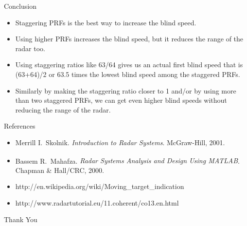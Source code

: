 \documentclass[mathserif]{beamer}
\begin{document}
    
    \begin{frame}{Conclusion}
      \begin{itemize}
       \item Staggering PRFs is the best way to increase the blind speed.
       \item Using higher PRFs increases the blind speed, but it reduces the range of the radar too.
       \item Using staggering ratios like 63/64 gives us an actual first blind speed that is (63+64)/2 or 63.5 times the lowest blind speed among the staggered PRFs.
       \item Similarly by making the staggering ratio closer to 1 and/or by using more than two staggered PRFs, we can get even higher blind speeds without reducing the range of the radar.
      \end{itemize}
    \end{frame}
    
    
    
    \begin{frame}{References}
        
        \begin{itemize}
                 \item Merrill I.~Skolnik. \emph{Introduction to Radar Systems}. McGraw-Hill, 2001.
                 \item Bassem R.~Mahafza. \emph{Radar Systems Analysis and Design Using MATLAB\textsuperscript{\textregistered}}. Chapman \& Hall/CRC, 2000.
                 \item http://en.wikipedia.org/wiki/Moving\_target\_indication
                 \item http://www.radartutorial.eu/11.coherent/co13.en.html
        \end{itemize}
    \end{frame}
    
    
    \begin{frame}[c]
     \begin{center}
       \Huge Thank You
     \end{center}
    \end{frame}

    
\end{document}
